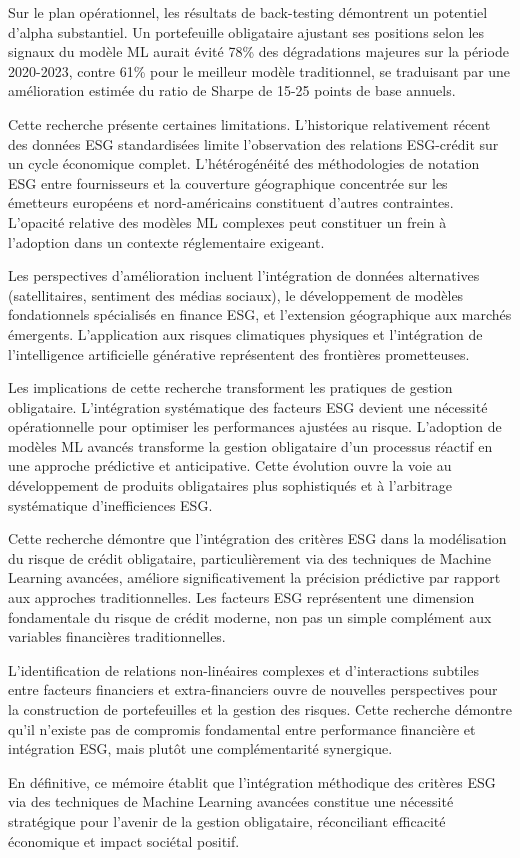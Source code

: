 Sur le plan opérationnel, les résultats de back-testing démontrent un potentiel d'alpha substantiel. Un portefeuille obligataire ajustant ses positions selon les signaux du modèle ML aurait évité 78\% des dégradations majeures sur la période 2020-2023, contre 61\% pour le meilleur modèle traditionnel, se traduisant par une amélioration estimée du ratio de Sharpe de 15-25 points de base annuels.

Cette recherche présente certaines limitations. L'historique relativement récent des données ESG standardisées limite l'observation des relations ESG-crédit sur un cycle économique complet. L'hétérogénéité des méthodologies de notation ESG entre fournisseurs et la couverture géographique concentrée sur les émetteurs européens et nord-américains constituent d'autres contraintes. L'opacité relative des modèles ML complexes peut constituer un frein à l'adoption dans un contexte réglementaire exigeant.

Les perspectives d'amélioration incluent l'intégration de données alternatives (satellitaires, sentiment des médias sociaux), le développement de modèles fondationnels spécialisés en finance ESG, et l'extension géographique aux marchés émergents. L'application aux risques climatiques physiques et l'intégration de l'intelligence artificielle générative représentent des frontières prometteuses.

Les implications de cette recherche transforment les pratiques de gestion obligataire. L'intégration systématique des facteurs ESG devient une nécessité opérationnelle pour optimiser les performances ajustées au risque. L'adoption de modèles ML avancés transforme la gestion obligataire d'un processus réactif en une approche prédictive et anticipative. Cette évolution ouvre la voie au développement de produits obligataires plus sophistiqués et à l'arbitrage systématique d'inefficiences ESG.

Cette recherche démontre que l'intégration des critères ESG dans la modélisation du risque de crédit obligataire, particulièrement via des techniques de Machine Learning avancées, améliore significativement la précision prédictive par rapport aux approches traditionnelles. Les facteurs ESG représentent une dimension fondamentale du risque de crédit moderne, non pas un simple complément aux variables financières traditionnelles.

L'identification de relations non-linéaires complexes et d'interactions subtiles entre facteurs financiers et extra-financiers ouvre de nouvelles perspectives pour la construction de portefeuilles et la gestion des risques. Cette recherche démontre qu'il n'existe pas de compromis fondamental entre performance financière et intégration ESG, mais plutôt une complémentarité synergique.

En définitive, ce mémoire établit que l'intégration méthodique des critères ESG via des techniques de Machine Learning avancées constitue une nécessité stratégique pour l'avenir de la gestion obligataire, réconciliant efficacité économique et impact sociétal positif.